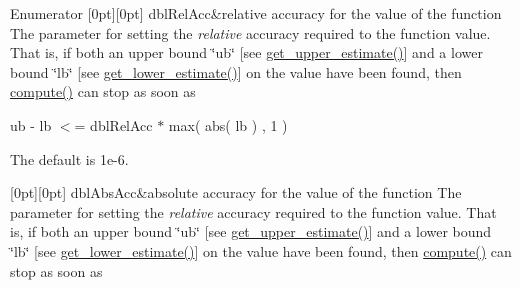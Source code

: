 \begin{DoxyEnumFields}{Enumerator}
[0pt][0pt]{}\mbox{\label{class_s_m_spp__di__unipi__it_1_1_function_ad7177cbeb2113eb7a975acec14d13027a6bafebef661615217b94425419f0d8d2}} 
dbl\+Rel\+Acc&relative accuracy for the value of the function The parameter for setting the {\itshape relative} accuracy required to the function value. That is, if both an upper bound \char`\"{}ub\char`\"{} \mbox{[}see \mbox{\hyperlink{class_s_m_spp__di__unipi__it_1_1_function_a018379619bc05b38bdab0e225016f98f}{get\+\_\+upper\+\_\+estimate()}}\mbox{]} and a lower bound \char`\"{}lb\char`\"{} \mbox{[}see \mbox{\hyperlink{class_s_m_spp__di__unipi__it_1_1_function_aa55bc7e19736e8d640ad31ec134b94fb}{get\+\_\+lower\+\_\+estimate()}}\mbox{]} on the value have been found, then \mbox{\hyperlink{class_s_m_spp__di__unipi__it_1_1_function_a504d4e3e174c7a518cc66156a8a45ce5}{compute()}} can stop as soon as

ub -\/ lb $<$= dbl\+Rel\+Acc $\ast$ max( abs( lb ) , 1 )

The default is 1e-\/6. \\
\hline

[0pt][0pt]{}\mbox{\label{class_s_m_spp__di__unipi__it_1_1_function_ad7177cbeb2113eb7a975acec14d13027aafe17e0e4a531284760badf1ad8f34d4}} 
dbl\+Abs\+Acc&absolute accuracy for the value of the function The parameter for setting the {\itshape relative} accuracy required to the function value. That is, if both an upper bound \char`\"{}ub\char`\"{} \mbox{[}see \mbox{\hyperlink{class_s_m_spp__di__unipi__it_1_1_function_a018379619bc05b38bdab0e225016f98f}{get\+\_\+upper\+\_\+estimate()}}\mbox{]} and a lower bound \char`\"{}lb\char`\"{} \mbox{[}see \mbox{\hyperlink{class_s_m_spp__di__unipi__it_1_1_function_aa55bc7e19736e8d640ad31ec134b94fb}{get\+\_\+lower\+\_\+estimate()}}\mbox{]} on the value have been found, then \mbox{\hyperlink{class_s_m_spp__di__unipi__it_1_1_function_a504d4e3e174c7a518cc66156a8a45ce5}{compute()}} can stop as soon as


\end{DoxyEnumFields}
